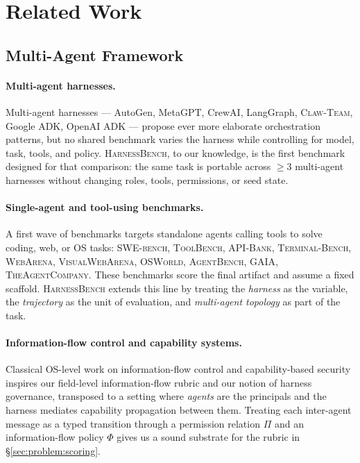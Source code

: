 \documentclass{article}
\newcommand{\benchname}{\textsc{HarnessBench}\xspace}
\begin{document}
\section{Related Work}
\subsection{Multi-Agent Framework}

\paragraph{Multi-agent harnesses.}
Multi-agent harnesses --- AutoGen, MetaGPT, CrewAI, LangGraph,
\textsc{Claw-Team}, Google ADK, OpenAI ADK --- propose ever more
elaborate orchestration patterns, but no shared benchmark varies
the harness while controlling for model, task, tools, and policy.
\benchname, to our knowledge, is the first benchmark designed for
that comparison: the same task is portable across $\geq 3$
multi-agent harnesses without changing roles, tools, permissions,
or seed state.

\paragraph{Single-agent and tool-using benchmarks.}
A first wave of benchmarks targets standalone agents calling tools
to solve coding, web, or OS tasks: \textsc{SWE-bench},
\textsc{ToolBench}, \textsc{API-Bank}, \textsc{Terminal-Bench},
\textsc{WebArena}, \textsc{VisualWebArena}, \textsc{OSWorld},
\textsc{AgentBench}, \textsc{GAIA}, \textsc{TheAgentCompany}. These
benchmarks score the final artifact and assume a fixed scaffold.
\benchname extends this line by treating the \emph{harness} as the
variable, the \emph{trajectory} as the unit of evaluation, and
\emph{multi-agent topology} as part of the task.

\paragraph{Information-flow control and capability systems.}
Classical OS-level work on information-flow control and
capability-based security inspires our field-level information-flow
rubric and our notion of harness governance, transposed to a
setting where \emph{agents} are the principals and the harness
mediates capability propagation between them. Treating each
inter-agent message as a typed transition through a permission
relation $\Pi$ and an information-flow policy $\Phi$ gives us a
sound substrate for the rubric in \S\ref{sec:problem:scoring}.
\end{document}
